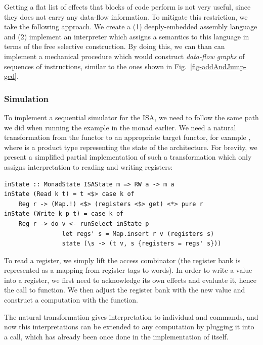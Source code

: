 Getting a flat list of effects that blocks of code perform is not very useful,
since they does not carry any data-flow information. To mitigate this restriction,
we take the following approach. We create a (1) deeply-embedded assembly language and
(2) implement an interpreter which assigns a semantics to this language in terms of the
free selective construction. By doing this, we can than can implement a mechanical procedure
which would construct \emph{data-flow graphs} of sequences of instructions, similar to
the ones shown in Fig.~\ref{fig-addAndJump-gcd}.

\subsubsection{\textbf{Simulation}}

To implement a sequential simulator for the ISA, we need to follow the same path we did
when running the  example in the  monad earlier. We need a natural
transformation from the functor  to an appropriate target functor, for example
, where  is a product type representing the state of the architecture. For brevity, we present a simplified
partial implementation of such a transformation which only assigns interpretation to reading
and writing registers:

\begin{verbatim}
inState :: MonadState ISAState m => RW a -> m a
inState (Read k t) = t <$> case k of
    Reg r -> (Map.!) <$> (registers <$> get) <*> pure r
inState (Write k p t) = case k of
    Reg r -> do v <- runSelect inState p
                let regs' s = Map.insert r v (registers s)
                state (\s -> (t v, s {registers = regs' s}))
\end{verbatim}

To read a register, we simply lift the  access combinator (the register bank
is represented as a mapping from register tags to words). In order to write a value into a
register, we first need to acknowledge its own effects and evaluate it, hence the call to
 function. We then adjust the register bank with the new value and construct
a  computation with the  function.

The  natural transformation gives interpretation to individual  and
 commands, and now this interpretations can be extended to any 
computation by plugging it into a  call, which has already been once done in
the implementation of  itself.

